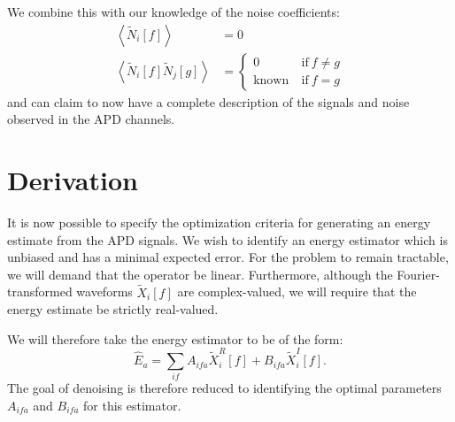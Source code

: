 We combine this with our knowledge of the noise coefficients:
\begin{subequations}\begin{align}
\left< \widetilde{N}_i[f] \right> &= 0 \\
\left< \widetilde{N}_i[f] \widetilde{N}_j[g] \right> &= \left\{ \begin{aligned}
0~ &\text{if}~ f \ne g \\
\text{known}~ &\text{if}~ f = g
\end{aligned}\right.
\end{align}\end{subequations}
and can claim to now have a complete description of the signals and noise observed in the APD channels.

\section{Derivation}

It is now possible to specify the optimization criteria for generating an energy estimate from the APD signals.  We wish to identify an energy estimator which is unbiased and has a minimal expected error.  For the problem to remain tractable, we will demand that the operator be linear.  Furthermore, although the Fourier-transformed waveforms $\widetilde{X}_i[f]$ are complex-valued, we will require that the energy estimate be strictly real-valued.

We will therefore take the energy estimator to be of the form:
\begin{equation}
\widehat{E}_a = \sum_{if} A_{ifa} \widetilde{X}_i^R[f] + B_{ifa} \widetilde{X}_i^I[f].
\end{equation}
The goal of denoising is therefore reduced to identifying the optimal parameters $A_{ifa}$ and $B_{ifa}$ for this estimator.

